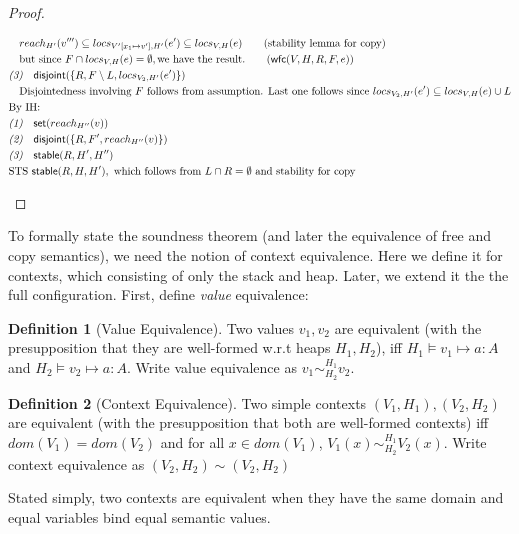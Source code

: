 \documentclass[11pt]{article}
\newcommand{\stable}[1]{\mathsf{stable}(#1)}
\newcommand{\set}[1]{\mathsf{set}(#1)}
\newcommand{\dist}[1]{\mathsf{disjoint}(#1)}
\newcommand{\wfc}[5]{\mathsf{wfc}(#1,#2,#3,#4,#5)}
\newcommand{\veq}[4]{#3 \sim^{#1}_{#2} #4}
\newcommand{\ctxeq}[2]{(#1) \sim (#2)}
\theoremstyle{definition}
\newtheorem{definition}{Definition}[section]
\begin{document}
\begin{proof}
\begin{description}
\begin{align*}
	&\quad reach_{H'}(v''') \subseteq locs_{V'[x_1\mapsto v'],H'}(e') \subseteq locs_{V,H}(e) 
		\tag{stability lemma for copy}\\ 
	&\quad \text{but since } F \cap locs_{V,H}(e) = \emptyset, \text{we have the result.}
		 \tag{$\wfc{V}{H}{R}{F}{e}$}\\
  &\emph{(3)} \quad \dist{\{R,F \setminus L,locs_{V_2,H'}(e')\}}\\
	&\quad \text{Disjointedness involving $F$ follows from assumption. Last one follows since }
		locs_{V_2,H'}(e') \subseteq locs_{V,H}(e) \cup L\\
	&\text{By IH:}\\
  &\emph{(1)} \quad \set{reach_{H''}(v)}\\
  &\emph{(2)} \quad \dist{\{R,F',reach_{H''}(v)\}}\\
  &\emph{(3)} \quad \stable{R,H',H''}\\
	&\text{STS } \stable{R,H,H'}, \text{ which follows from $L \cap R = \emptyset$ and stability for copy}\\
  \end{align*}
  \end{description}
\end{proof}

To formally state the soundness theorem (and later the equivalence of free and copy semantics), we need the notion
of context equivalence. Here we define it for contexts, which consisting of only the stack and heap. Later, 
we extend it the the full configuration. First, define \emph{value} equivalence: 

\begin{definition}[Value Equivalence]
Two values $v_1,v_2$ are equivalent (with the presupposition that they are well-formed w.r.t heaps $H_1,H_2$),
iff $H_1 \vDash v_1 \mapsto a : A$ and $H_2 \vDash v_2 \mapsto a : A$. 
Write value equivalence as $\veq{H_1}{H_2}{v_1}{v_2}$.
\end{definition}

\begin{definition}[Context Equivalence]
Two simple contexts $(V_1,H_1), (V_2,H_2)$ are equivalent
(with the presupposition that both are well-formed contexts) iff $dom(V_1) = dom(V_2)$ and 
for all $x \in dom(V_1)$, $\veq{H_1}{H_2}{V_1(x)}{V_2(x)}$. Write context equivalence as 
$\ctxeq{V_2,H_2}{V_2,H_2}$
\end{definition}

Stated simply, two contexts are equivalent when they have the same domain and equal variables bind equal 
semantic values.
\end{document}
